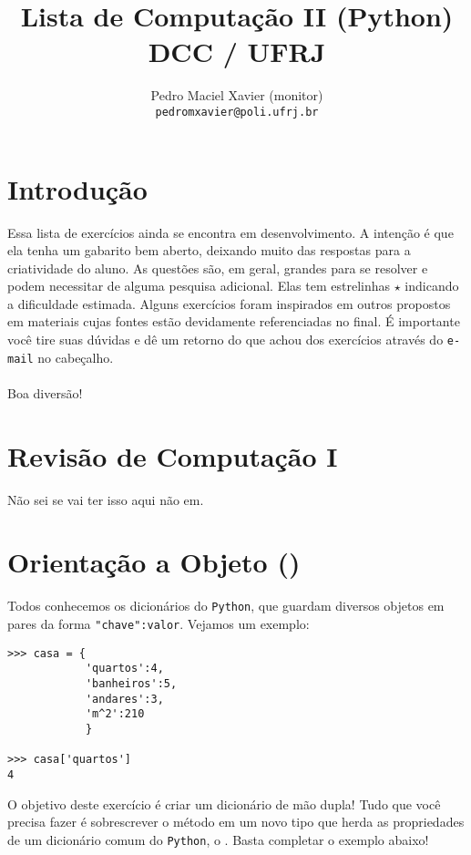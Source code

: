 \documentclass[12pt]{article}
\title{Lista de Computação II (Python) \\ {\normalsize DCC / UFRJ}}
\author{Pedro Maciel Xavier (monitor)\\ \texttt{pedromxavier@poli.ufrj.br}}
\begin{document}
	\maketitle
	\section*{Introdução}
	Essa lista de exercícios ainda se encontra em desenvolvimento. A intenção é que ela tenha um gabarito bem aberto, deixando muito das respostas para a criatividade do aluno. As questões são, em geral, grandes para se resolver e podem necessitar de alguma pesquisa adicional. Elas tem estrelinhas $\star$ indicando a dificuldade estimada. Alguns exercícios foram inspirados em outros propostos em materiais cujas fontes estão devidamente referenciadas no final. É importante você tire suas dúvidas e dê um retorno do que achou dos exercícios através do \texttt{e-mail} no cabeçalho.
	~\\
	~\\
	Boa diversão! \par
	\pagebreak
	
	
	\tableofcontents
	\pagebreak
	
	\section*{Revisão de Computação I}
	
	Não sei se vai ter isso aqui não em.

	\section{Orientação a Objeto ()}
	
	
	Todos conhecemos os dicionários do \texttt{Python}, que guardam diversos objetos em pares da forma \texttt{"chave":valor}. Vejamos um exemplo:
	
\begin{lstlisting}[caption="Dicionário Normal"]
>>> casa = {
			'quartos':4,
			'banheiros':5,
			'andares':3,
			'm^2':210
			}
			
>>> casa['quartos']
4 
\end{lstlisting}

	O objetivo deste exercício é criar um dicionário de mão dupla! Tudo que você precisa fazer é sobrescrever o método  em um novo tipo que herda as propriedades de um dicionário comum do \texttt{Python}, o . Basta completar o exemplo abaixo!
	
\end{document}
